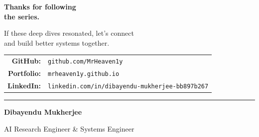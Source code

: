 \documentclass[11pt]{article}
\begin{document}
\begin{center}

    {\fontsize{32}{38}\selectfont\color{brandnavy}\bfseries
    Thanks for following\\[0.15in]
    the series.
    }

    \vspace{0.4in}

    {\fontsize{16}{22}\selectfont\color{brandgray}
    If these deep dives resonated, let's connect\\
    and build better systems together.
    }

    \vspace{0.6in}

    \begin{infobox}[top=15pt, bottom=15pt, left=20pt, right=20pt]
    \centering
    {\fontsize{11}{14}\selectfont\color{brandnavy}
    \begin{tabular}{@{}r l@{}}
    \textbf{GitHub:} & \texttt{github.com/MrHeaven1y} \\[0.08in]
    \textbf{Portfolio:} & \texttt{mrheaven1y.github.io} \\[0.08in]
    \textbf{LinkedIn:} & \texttt{linkedin.com/in/dibayendu-mukherjee-bb897b267}
    \end{tabular}
    }
    \end{infobox}

    \vfill

    \rule{0.6\linewidth}{0.5pt}

    \vspace{0.2in}

    {\fontsize{14}{16}\selectfont\color{brandnavy}\textbf{Dibayendu Mukherjee}}

    \vspace{0.05in}

    {\fontsize{11}{13}\selectfont\color{brandgray}
    AI Research Engineer \& Systems Engineer
    }

    \vspace*{0.3in}

\end{center}
\end{document}

